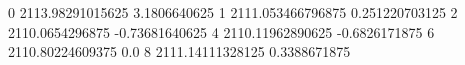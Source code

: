 0 2113.98291015625 3.1806640625
1 2111.053466796875 0.251220703125
2 2110.0654296875 -0.73681640625
4 2110.11962890625 -0.6826171875
6 2110.80224609375 0.0
8 2111.14111328125 0.3388671875

